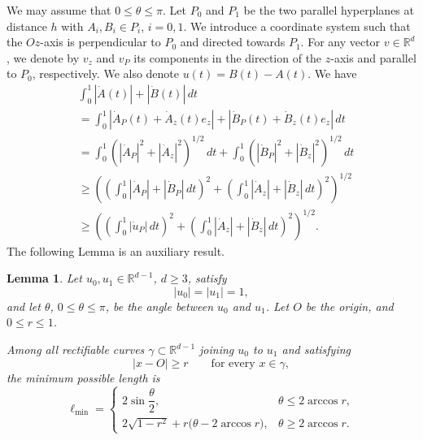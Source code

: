 \documentclass[a4paper,12pt,reqno]{amsart}
\newtheorem{lemma}[theorem]{Lemma}
\begin{document}
We may assume that $0\le \theta\le \pi$. Let $P_0$ and $P_1$ be the two parallel hyperplanes at distance $h$ with $A_i,B_i\in P_i$, $i=0,1$. We introduce a coordinate system such that the $Oz$-axis is perpendicular to $P_0$ and directed towards $P_1$. For any vector $v\in\mathbb{R}^d$, we denote by $v_z$ and $v_P$ its components in the direction of the $z$-axis and parallel to $P_0$, respectively. We also denote $u(t)=B(t)-A(t)$. We have
\[
\begin{aligned}
&\int_0^1 |\dot{A}(t)|+|\dot{B}(t)|\,dt\\
&=\int_0^1 |\dot{A}_P(t)+\dot{A}_z(t)e_z|+|\dot{B}_P(t)+\dot{B}_z(t)e_z|\,dt \\
&= \int_0^1 \left(|\dot{A}_P|^2+|\dot{A}_z|^2 \right)^{1/2}\,dt + \int_0^1 \left(|\dot{B}_P|^2+|\dot{B}_z|^2 \right)^{1/2}\,dt\\
&\ge \left(\left( \int_0^1|\dot{A}_P|+ |\dot{B}_P| \,dt\right)^{2} +\left(\int_0^1|\dot{A}_z|+|\dot{B}_z|\,dt\right)^2 \right)^{1/2}\\
&\ge \left(\left( \int_0^1|\dot{u}_P|\, dt \right)^{2} +\left(\int_0^1|\dot{A}_z|+|\dot{B}_z|\,dt\right)^2 \right)^{1/2}.
\end{aligned}
\]
The following Lemma is an auxiliary result. 

\begin{lemma}
\label{lem:min_path}
Let \(u_0,u_1\in\mathbb R^{d-1}\), $d\ge 3$, satisfy
\[
|u_0|=|u_1|=1,
\]
and let \(\theta\), \(0\le \theta\le \pi\), be the angle between \(u_0\) and \(u_1\).
Let \(O\) be the origin, and $0\le r\le 1$.

Among all rectifiable curves \(\gamma\subset\mathbb R^{d-1}\) joining \(u_0\) to \(u_1\)
and satisfying
\[
|x-O|\ge r
\qquad\text{for every }x\in\gamma,
\]
the minimum possible length is
\[
\ell_{\min}
=
\begin{cases}
2\sin\dfrac{\theta}{2},
&
\theta\le 2\arccos r,
\\[8pt]
2\sqrt{1-r^2}+r\bigl(\theta-2\arccos r\bigr),
&
\theta\ge 2\arccos r.
\end{cases}
\]
\end{lemma}
\end{document}
